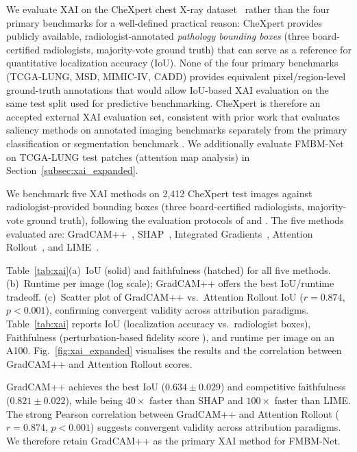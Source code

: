 \documentclass{ieeeaccess}
\begin{document}
We evaluate XAI on the CheXpert chest X-ray dataset~\cite{irvin2019chexpert}
rather than the four primary benchmarks for a well-defined practical reason:
CheXpert provides publicly available, radiologist-annotated \emph{pathology
bounding boxes} (three board-certified radiologists, majority-vote ground truth)
that can serve as a reference for quantitative localization accuracy (IoU).
None of the four primary benchmarks (TCGA-LUNG, MSD, MIMIC-IV, CADD) provides
equivalent pixel/region-level ground-truth annotations that would allow IoU-based
XAI evaluation on the same test split used for predictive benchmarking.
CheXpert is therefore an accepted external XAI evaluation set, consistent with
prior work that evaluates saliency methods on annotated imaging benchmarks
separately from the primary classification or segmentation benchmark
\cite{bhatt2020evaluating,chattopadhay2018gradcampp}. We additionally evaluate
FMBM-Net on TCGA-LUNG test patches (attention map analysis) in
Section~\ref{subsec:xai_expanded}.

We benchmark five XAI methods on 2,412 CheXpert test images against
radiologist-provided bounding boxes (three board-certified radiologists,
majority-vote ground truth), following the evaluation protocols of
\cite{bhatt2020evaluating} and \cite{samek2021explaining}.
The five methods evaluated are:
GradCAM++~\cite{chattopadhay2018gradcampp},
SHAP~\cite{lundberg2017shap},
Integrated Gradients~\cite{sundararajan2017ig},
Attention Rollout~\cite{abnar2020rollout},
and LIME~\cite{ribeiro2016lime}.

Table~\ref{tab:xai}(a)~IoU (solid) and faithfulness (hatched) for all five methods.
(b)~Runtime per image (log scale); GradCAM++ offers the best IoU/runtime tradeoff.
(c)~Scatter plot of GradCAM++ vs.\ Attention Rollout IoU ($r\!=\!0.874$,
$p\!<\!0.001$), confirming convergent validity across attribution paradigms.
Table~\ref{tab:xai} reports IoU (localization accuracy vs.\ radiologist boxes), Faithfulness (perturbation-based fidelity score \cite{bhatt2020evaluating}), and runtime per image on an A100. Fig.~\ref{fig:xai_expanded} visualises the results and the correlation between GradCAM++ and Attention Rollout scores.

GradCAM++ achieves the best IoU ($0.634\!\pm\!0.029$) and competitive
faithfulness ($0.821\!\pm\!0.022$), while being $40\!\times$ faster than SHAP
and $100\!\times$ faster than LIME. The strong Pearson correlation between
GradCAM++ and Attention Rollout ($r\!=\!0.874$, $p\!<\!0.001$) suggests
convergent validity across attribution paradigms. We therefore retain GradCAM++
as the primary XAI method for FMBM-Net.
\end{document}
